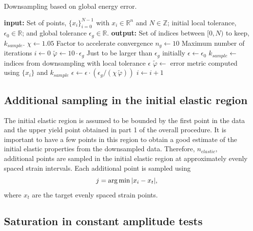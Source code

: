 \documentclass[a4paper,11pt]{article}
\begin{document}
\begin{algorithm}
	\caption{Downsampling based on global energy error.}
	\label{alg:global-err-downsampling}
	\begin{algorithmic}[1]
		\State \textbf{input:} Set of points, $\{x_i\}_{i=0}^{N-1}$ with $x_i \in \mathbb{R}^n$ and $N \in \mathbb{Z}$; initial local tolerance, $\epsilon_0 \in \mathbb{R}$; and
        global tolerance $\epsilon_g \in \mathbb{R}$.
        \State \textbf{output:} Set of indices between $[0, N)$ to keep, $k_{sample}$.
        \State $\chi \gets 1.05$
        \Comment Factor to accelerate convergence
        \State $n_g \gets 10$
        \Comment Maximum number of iterations
        \State $i \gets 0$
        \State $\tilde{\varphi} \gets 10 \cdot \epsilon_g$
        \Comment Just to be larger than $\epsilon_g$ initially
        \State $\epsilon \gets \epsilon_0$
            \State $k_{sample} \gets$ indices from downsampling with local tolerance $\epsilon$
            \State $\tilde{\varphi} \gets$ error metric computed using $\{x_i\}$ and $k_{sample}$
                \State $\epsilon \gets \epsilon \cdot (\epsilon_g / (\chi \, \tilde{\varphi}))$
                \State $i \gets i + 1$
            \EndIf
		\EndWhile
\end{algorithmic}
\end{algorithm}

\subsection{Additional sampling in the initial elastic region}

The initial elastic region is assumed to be bounded by the first point in the data and the upper yield point obtained in part 1 of the overall procedure.
It is important to have a few points in this region to obtain a good estimate of the initial elastic properties from the downsampled data.
Therefore, $n_{elastic}$, additional points are sampled in the initial elastic region at approximately evenly spaced strain intervals.
Each additional point is sampled using
\begin{equation}
    j = \arg \min \abs{x_i - x_{t}},
\end{equation}
where $x_t$ are the target evenly spaced strain points.

\subsection{Saturation in constant amplitude tests}
\end{document}
